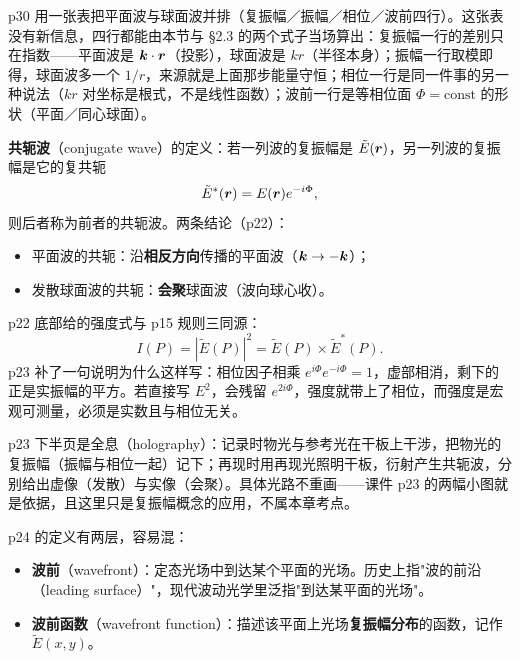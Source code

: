 \documentclass[10pt]{ctexart}
\newcommand{\Etil}{\tilde{E}}
\begin{document}

p30 用一张表把平面波与球面波并排（复振幅／振幅／相位／波前四行）。这张表没有新信息，四行都能由本节与 §2.3 的两个式子当场算出：复振幅一行的差别只在指数——平面波是 $\boldsymbol{k}\cdot\boldsymbol{r}$（投影），球面波是 $kr$（半径本身）；振幅一行取模即得，球面波多一个 $1/r$，来源就是上面那步能量守恒；相位一行是同一件事的另一种说法（$kr$ 对坐标是根式，不是线性函数）；波前一行是等相位面 $\Phi=\text{const}$ 的形状（平面／同心球面）。


\textbf{共轭波}（conjugate wave）的定义：若一列波的复振幅是 $\Etil(\vect r)$，另一列波的复振幅是它的复共轭
\[
\Etil^{*}(\vect r)=E(\vect r)e^{-i\Phi},
\]
则后者称为前者的共轭波。两条结论（p22）：
\begin{itemize}
\item 平面波的共轭：沿\textbf{相反方向}传播的平面波（$\boldsymbol{k}\to-\boldsymbol{k}$）；
\item 发散球面波的共轭：\textbf{会聚}球面波（波向球心收）。
\end{itemize}
p22 底部给的强度式与 p15 规则三同源：
\[
I(P)=|\Etil(P)|^2=\Etil(P)\times\Etil^{*}(P).
\]
p23 补了一句说明为什么这样写：相位因子相乘 $e^{i\Phi}e^{-i\Phi}=1$，虚部相消，剩下的正是实振幅的平方。若直接写 $E^2$，会残留 $e^{2i\Phi}$，强度就带上了相位，而强度是宏观可测量，必须是实数且与相位无关。


p23 下半页是全息（holography）：记录时物光与参考光在干板上干涉，把物光的复振幅（振幅与相位一起）记下；再现时用再现光照明干板，衍射产生共轭波，分别给出虚像（发散）与实像（会聚）。具体光路不重画——课件 p23 的两幅小图就是依据，且这里只是复振幅概念的应用，不属本章考点。


p24 的定义有两层，容易混：
\begin{itemize}
\item \textbf{波前}（wavefront）：定态光场中到达某个平面的光场。历史上指"波的前沿（leading surface）"，现代波动光学里泛指"到达某平面的光场"。
\item \textbf{波前函数}（wavefront function）：描述该平面上光场\textbf{复振幅分布}的函数，记作 $\Etil(x,y)$。
\end{itemize}
\end{document}
